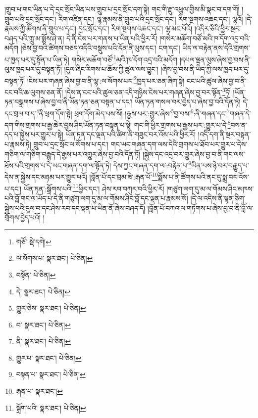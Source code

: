 །གྲུབ་པ་གང་ཡིན་པ་དེ་དྲང་སྲོང་ཡིན་པས་གྲུབ་པ་དྲང་སྲོང་དག་སྟེ། གང་གི་རྫུ་འཕྲུལ་གྱིས་མི་སྣང་བ་དག་གོ། །གྲུབ་པའི་དྲང་སྲོང་དང་། རིག་འཛིན་དང་། ལྷ་རྣམས་ནི་གྲུབ་པའི་དྲང་སྲོང་དང་། རིག་སྔགས་འཆང་དང་། ལྷའོ། །དེ་རྣམས་ཀྱི་ཚོགས་ནི་གྲུབ་པ་དང་། དྲང་སྲོང་དང་། རིག་སྔགས་འཆང་དང་། ལྷ་མང་པོའོ། །འདིར་ཅིའི་ཕྱིར་སྔར་བཤད་པའི་ཀླུ་མ་སྨོས་ཤེ་ན། དེ་ནི་ངེས་པར་གནས་པ་ཡིན་པའི་ཕྱིར་རོ། །གསེར་མཆོག་བཙོ་མའི་ཁ་དོག་འདྲ་བའི་མདོག །ཅེས་བྱ་བའི་ཚིགས་བཅད་འདིའི་བསྡུས་པའི་དོན་ནི་ལུས་དང་། ངག་དང་། ཡིད་ལ་བརྟེན་ནས་དེའི་གྲགས་པ་ཁྱད་པར་དུ་སྟོན་པ་ཡིན་ཏེ། གསེར་མཆོག་བཙོ་\footnote{གཙོ་  སྡེ་དགེ། }མའི་ཁ་དོག་འདྲ་བའི་མདོག །དཔལ་ལྡན་ལུས་ཞེས་བྱ་བས་ནི་ལུས་ཁྱད་པར་དུ་བསྟན་ཏོ། །དུལ་ཞིང་རིགས་པ་ཆོས་ཀྱི་ཚུལ་ལས་བྱུང་། །ཞེས་བྱ་བས་ནི་ཡིད་ཀྱི་ལས་ཁྱད་པར་དུ་བསྟན་ཏོ། །ངེས་པར་གཞན་ཞེས་བྱ་བ་ནི་ལྷ་:ལ་སོགས་པར་\footnote{ལ་སོགས་པ་  སྣར་ཐང་།  པེ་ཅིན། }ཁྱད་པར་ཅན་ཞིག་སྟེ། ངང་པའི་ཚུལ་ཞེས་བྱ་བ་ནི་ངང་བའི་ཆ་ལུགས་ཅན་ནོ། །དེས་ན་ངང་པའི་ཚུལ་ཅན་འདི་གཉིས་ངེས་པར་གཞན་ཞེས་བྱ་བར་སྟོན་\footnote{བསྟོན་  པེ་ཅིན། }ཏོ། །ཡོན་ཏན་བསྒྲགས་པ་ཞེས་བྱ་བ་ནི་ཡོན་ཏན་ཅན་བསྟན་པ་དང་། ཡོན་ཏན་གསལ་བར་བྱེད་པ་ཞེས་བྱ་བའི་དོན་ཏེ། དེ་དང་བྲལ་བ་ད་\footnote{དེ་  སྣར་ཐང་།  པེ་ཅིན། }ནི་ཕྲག་དོག་སྟེ། ཕྲག་དོག་མེད་པས་སོ། །རྒྱས་པར་:གྱུར་ཞེས་\footnote{གྱུར་ཅེས་  སྣར་ཐང་།  པེ་ཅིན། }བྱ་བས་\footnote{བ་  སྣར་ཐང་།  པེ་ཅིན། }:ནི་གཞན་དང་\footnote{ནི་  སྣར་ཐང་།  པེ་ཅིན། }གཞན་དེ་དག་གིས་གྲགས་པ་རྒྱ་ཆེར་བྱས་ཤིང་ཡོན་ཏན་བསྟན་པ་སྟེ། གང་གི་ཕྱིར་གྲགས་པ་རྒྱས་པར་:གྱུར་པ་དེ་\footnote{གྱུར་པ་  སྣར་ཐང་།  པེ་ཅིན། }བས་ན་དད་པ་སྐྱེས་པར་གྱུར་པ་སྟེ། ཡོན་ཏན་དང་ལྡན་པའི་ཚིག་ནི་གཟུང་བར་འོས་པའི་ཕྱིར་རོ། །འདི་དག་ནི་སྔར་བསྟན་པ་རྣམས་ཏེ། གྲུབ་པ་དྲང་སྲོང་ལ་སོགས་པ་དང་། གང་ཡང་གཞན་དག་ལས་དེའི་གྲགས་པ་ཐོབ་པར་གྱུར་པ་དེས་གཅིག་ལ་གཅིག་བརྒྱུད་དེ་རྒྱས་པར་འགྱུར་ཞེས་བྱ་བའི་དོན་ཏོ། །སྐྱེས་དང་འདྲ་བར་གྱུར་ཞེས་བྱ་བ་ནི་གང་ལས་ཐོས་པའི་གྲགས་པ་དེ་ཡང་གཞན་དག་ལ་སྟོན་ཏེ། དེས་ཀྱང་གཞན་དག་ལ་:བརྟེན་པ་\footnote{བསྟན་པ་  སྣར་ཐང་།  པེ་ཅིན། }ཡིན་པས་ཉེ་བར་བརྒྱུད་པ་དེས་ན་སྐྱེས་དང་མཉམ་པར་གྱུར་པའོ། །བློན་པོ་དང་བྲམ་ཟེ་:རྒན་པོ་\footnote{རྒན་པ་  སྣར་ཐང་། }སྨོས་པ་ནི་ཚོགས་པའི་ནང་དུ་སྨྲ་བར་འོས་པ་དང་། ཡོན་ཏན་:སྒྲོགས་པའི་\footnote{སྒྲོག་པའི་  སྣར་ཐང་།  པེ་ཅིན། }ཕྱིར་དང་། ཤེས་རབ་བཀུར་བའི་ཕྱིར་རོ། །གཙུག་ལག་དུ་མ་ལ་གོམས་ཤིང་མཁས་པའི་བློ་གང་ལ་ཡོད་པ་དེ་ནི་གཙུག་ལག་དུ་མ་ལ་གོམས་ཤིང་བློ་དང་ལྡན་པ་རྣམས་སོ། །དེ་ལ་འདིས་ནི་ལྷན་ཅིག་སྐྱེས་པའི་དུལ་བ་དང་ཤེས་རབ་དང་ལྡན་པ་ཡིན་ནོ་ཞེས་བཤད་དོ། །བློན་པོ་བཀའ་ལ་གཏོགས་པ་ཞེས་བྱ་བ་ནི་བློ་ལ་གྲོགས་བྱེད་པའོ། །
